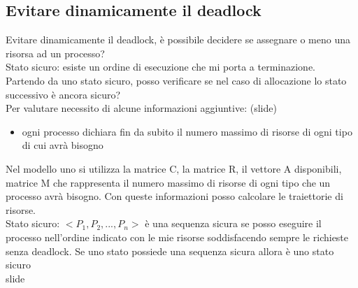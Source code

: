 \documentclass{article}
\begin{document}
\subsection{Evitare dinamicamente il deadlock}
Evitare dinamicamente il deadlock, è possibile decidere se assegnare o meno una risorsa ad un processo?\\
Stato sicuro: esiste un ordine di esecuzione che mi porta a terminazione.\\
Partendo da uno stato sicuro, posso verificare se nel caso di allocazione lo stato successivo è ancora sicuro?\\
Per valutare necessito di alcune informazioni aggiuntive:
(slide)
\begin{itemize}
    \item ogni processo dichiara fin da subito il numero massimo di risorse di ogni tipo di cui avrà bisogno
\end{itemize}

Nel modello uno si utilizza la matrice C, la matrice R, il vettore A disponibili, matrice M che rappresenta il numero massimo di risorse 
di ogni tipo che un processo avrà bisogno. Con queste informazioni posso calcolare le traiettorie di risorse.\\
Stato sicuro: $<P_1, P_2, ... , P_n>$ è una sequenza sicura se posso eseguire il processo nell'ordine indicato con le mie risorse soddisfacendo sempre 
le richieste senza deadlock. Se uno stato possiede una sequenza sicura allora è uno stato sicuro\\
slide \\
\end{document}

